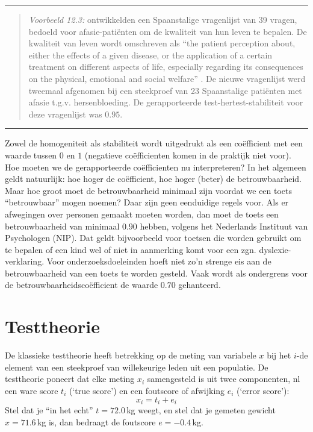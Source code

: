 \documentclass[
]{book}
\begin{document}
\begin{center}\rule{0.5\linewidth}{0.5pt}\end{center}

\begin{quote}
\emph{Voorbeeld 12.3:}
\citep{Lata09} ontwikkelden
een Spaanstalige vragenlijst van 39 vragen, bedoeld voor
afasie-patiënten om de kwaliteit van hun leven te bepalen. De kwaliteit
van leven wordt omschreven als ``the patient perception about, either the
effects of a given disease, or the application of a certain treatment on
different aspects of life, especially regarding its consequences on the
physical, emotional and social welfare'' \citep[ p.379]{Lata09}. De nieuwe
vragenlijst werd tweemaal afgenomen bij een steekproef van 23
Spaanstalige patiënten met afasie t.g.v. hersenbloeding. De
gerapporteerde test-hertest-stabiliteit voor deze vragenlijst was
\(0.95\).
\end{quote}

\begin{center}\rule{0.5\linewidth}{0.5pt}\end{center}

Zowel de homogeniteit als stabiliteit wordt uitgedrukt als een
coëfficient met een waarde tussen \(0\) en \(1\) (negatieve coëfficienten
komen in de praktijk niet voor). Hoe moeten we de gerapporteerde
coëfficienten nu interpreteren? In het algemeen geldt natuurlijk: hoe
hoger de coëfficient, hoe hoger (beter) de betrouwbaarheid. Maar hoe
groot moet de betrouwbaarheid minimaal zijn voordat we een toets
``betrouwbaar'' mogen noemen? Daar zijn geen eenduidige regels voor. Als
er afwegingen over personen gemaakt moeten worden, dan moet de toets een
betrouwbaarheid van minimaal \(0.90\) hebben, volgens het Nederlands
Instituut van Psychologen (NIP). Dat geldt bijvoorbeeld voor toetsen die
worden gebruikt om te bepalen of een kind wel of niet in aanmerking komt
voor een zgn. dyslexie-verklaring. Voor onderzoeksdoeleinden hoeft niet
zo'n strenge eis aan de betrouwbaarheid van een toets te worden gesteld.
Vaak wordt als ondergrens voor de betrouwbaarheidscoëfficient de waarde
\(0.70\) gehanteerd.

\hypertarget{testtheorie}{%
\section{Testtheorie}\label{testtheorie}}

De klassieke testtheorie heeft betrekking op de meting van variabele \(x\)
bij het \(i\)-de element van een steekproef van willekeurige leden uit een
populatie. De testtheorie poneert dat elke meting \(x_i\) samengesteld is
uit twee componenten, nl een ware score \(t_i\) (`true score') en een
foutscore of afwijking \(e_i\) (`error score'):
\begin{equation}
  x_i = t_i + e_i
  \label{eq:obs-true-error}
\end{equation}
Stel dat je ``in het echt'' \(t=72.0\) kg weegt, en stel
dat je gemeten gewicht \(x=71.6\) kg is, dan bedraagt de foutscore
\(e=-0.4\) kg.
\end{document}
